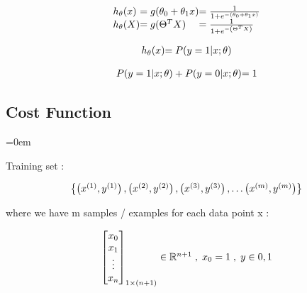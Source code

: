 
\[
\begin{array}{ l@{} l@{} l@{} }
	h_\theta(x)
	& = g(\theta_0 + \theta_1 x) 
	& =
	\frac{1}
	{
		1+e^
		{
			-
			\left(
				\theta_0 + \theta_1 x
			\right)
		}
	}
	\\
	h_\theta(X)
	& = g(\Theta^T X)
	& =
	\frac{1}
	{
		1+e^
		{
			-
			\left(
				\Theta^T X
			\right)
		}
	}
	\\
\end{array}
\]

\[
	\begin{array}{ l@{} l@{} }

	h_\theta(x) & = P(y=1|x;\theta)\\

	\end{array}
\]

\[
	\begin{array}{ l@{} l@{} }

	P(y=1|x;\theta) + P(y=0|x;\theta) & = 1 \\

	\end{array}
\]

\pagebreak
\subsectionend
\subsection{Cost Function}
\label{ssec:cost_function}
\parindent=0em

Training set :

\[
	\begin{array}{ l@{} l@{} }
	\left\{
		\left( x^{(1)},y^{(1)} \right),
		\left( x^{(2)},y^{(2)} \right),
		\left( x^{(3)},y^{(3)} \right),
		\ldots
		\left( x^{(m)},y^{(m)} \right)
	\right\}
	\end{array}
\]

where we have m samples / examples for each data point x :

\[
	\begin{array}{ l@{} l@{} }
	\begin{bmatrix}
		x_0 \\
		x_1 \\
		\vdots \\
		x_n \\
		\end{bmatrix}
		_{1 \times(n+1)}
	\in \mathbb{R}^{n+1}
	\; , \;
	x_0 = {1}
	\; , \;
	y \in {0,1}
	\end{array}
\]



